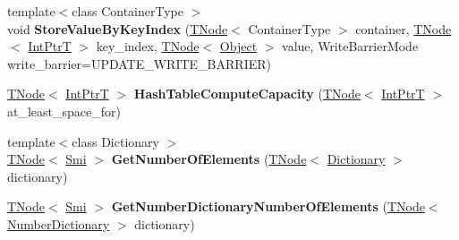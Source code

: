\begin{DoxyCompactItemize}
\item 
\mbox{\label{classv8_1_1internal_1_1CodeStubAssembler_a6a1392e11587b1a3c271092e4a7bddd4}} 
{\footnotesize template$<$class Container\+Type $>$ }\\void {\bfseries Store\+Value\+By\+Key\+Index} (\mbox{\hyperlink{classv8_1_1internal_1_1compiler_1_1TNode}{T\+Node}}$<$ Container\+Type $>$ container, \mbox{\hyperlink{classv8_1_1internal_1_1compiler_1_1TNode}{T\+Node}}$<$ \mbox{\hyperlink{structv8_1_1internal_1_1IntPtrT}{Int\+PtrT}} $>$ key\+\_\+index, \mbox{\hyperlink{classv8_1_1internal_1_1compiler_1_1TNode}{T\+Node}}$<$ \mbox{\hyperlink{classv8_1_1internal_1_1Object}{Object}} $>$ value, Write\+Barrier\+Mode write\+\_\+barrier=U\+P\+D\+A\+T\+E\+\_\+\+W\+R\+I\+T\+E\+\_\+\+B\+A\+R\+R\+I\+ER)
\item 
\mbox{\label{classv8_1_1internal_1_1CodeStubAssembler_ac0fa7e1684a0be1ed0c654bee8a2d7ab}} 
\mbox{\hyperlink{classv8_1_1internal_1_1compiler_1_1TNode}{T\+Node}}$<$ \mbox{\hyperlink{structv8_1_1internal_1_1IntPtrT}{Int\+PtrT}} $>$ {\bfseries Hash\+Table\+Compute\+Capacity} (\mbox{\hyperlink{classv8_1_1internal_1_1compiler_1_1TNode}{T\+Node}}$<$ \mbox{\hyperlink{structv8_1_1internal_1_1IntPtrT}{Int\+PtrT}} $>$ at\+\_\+least\+\_\+space\+\_\+for)
\item 
\mbox{\label{classv8_1_1internal_1_1CodeStubAssembler_af737a59bab787c0172abc900886b5b5d}} 
{\footnotesize template$<$class Dictionary $>$ }\\\mbox{\hyperlink{classv8_1_1internal_1_1compiler_1_1TNode}{T\+Node}}$<$ \mbox{\hyperlink{classv8_1_1internal_1_1Smi}{Smi}} $>$ {\bfseries Get\+Number\+Of\+Elements} (\mbox{\hyperlink{classv8_1_1internal_1_1compiler_1_1TNode}{T\+Node}}$<$ \mbox{\hyperlink{classv8_1_1internal_1_1Dictionary}{Dictionary}} $>$ dictionary)
\item 
\mbox{\label{classv8_1_1internal_1_1CodeStubAssembler_aa647e3e6500a3156abb46bdebb386b6a}} 
\mbox{\hyperlink{classv8_1_1internal_1_1compiler_1_1TNode}{T\+Node}}$<$ \mbox{\hyperlink{classv8_1_1internal_1_1Smi}{Smi}} $>$ {\bfseries Get\+Number\+Dictionary\+Number\+Of\+Elements} (\mbox{\hyperlink{classv8_1_1internal_1_1compiler_1_1TNode}{T\+Node}}$<$ \mbox{\hyperlink{classv8_1_1internal_1_1NumberDictionary}{Number\+Dictionary}} $>$ dictionary)

\end{DoxyCompactItemize}

